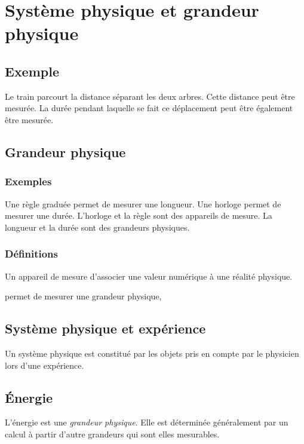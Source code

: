 
\chapter{Système physique et grandeur physique}
%

\section{Exemple}

Le train parcourt la distance séparant les deux arbres. Cette distance peut être mesurée. La durée pendant laquelle se fait ce déplacement peut être également être mesurée.

\section{Grandeur physique}
  \subsection{Exemples}

Une règle graduée permet de mesurer une longueur. Une horloge permet de mesurer une durée. L'horloge et la règle sont des appareils de mesure. La longueur et la durée sont des grandeurs physiques.

  \subsection{Définitions}

Un appareil de mesure d'associer une valeur numérique à une réalité physique.

 permet de mesurer une grandeur physique,

\section{Système physique et expérience}

Un système physique est constitué par les objets pris en compte par le physicien lors d'une expérience.

\section{Énergie}

L'énergie est une {\it grandeur physique}. Elle est déterminée généralement par un calcul à partir d'autre grandeurs qui sont elles mesurables.


